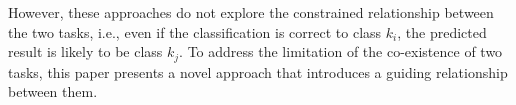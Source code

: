 However, these approaches do not explore the constrained relationship between the two tasks, i.e., even if the classification is correct to class $k_i$, the predicted result is likely to be class $k_j$. To address the limitation of the co-existence of two tasks, this paper presents a novel approach that introduces a guiding relationship between them.\\
